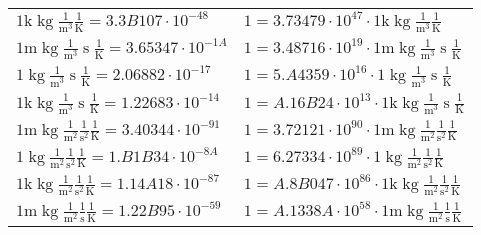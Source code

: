 \begin{center}
\begin{longtable}{l l}
{\color{gray}$1 \bm{\mathrm{ k}}\operatorname{kg}\frac1{\operatorname{m}^3}{}{}\frac1{\operatorname{K}} = 3.3B107\cdot10^{-48} $}   & {\color{gray}$ 1 = 3.73479\cdot10^{47} \cdot 1 \bm{\mathrm{ k}}\operatorname{kg}\frac1{\operatorname{m}^3}{}{}\frac1{\operatorname{K}}$}  \\
{\color{gray}$1 \bm{\mathrm{ m}}\operatorname{kg}\frac1{\operatorname{m}^3}{\operatorname{s}}{}\frac1{\operatorname{K}} = 3.65347\cdot10^{-1A} $}   & {\color{gray}$ 1 = 3.48716\cdot10^{19} \cdot 1 \bm{\mathrm{ m}}\operatorname{kg}\frac1{\operatorname{m}^3}{\operatorname{s}}{}\frac1{\operatorname{K}}$}  \\
{\color{black}$1 \bm{\mathrm{ }}\operatorname{kg}\frac1{\operatorname{m}^3}{\operatorname{s}}{}\frac1{\operatorname{K}} = 2.06882\cdot10^{-17} $}   & {\color{black}$ 1 = 5.A4359\cdot10^{16} \cdot 1 \bm{\mathrm{ }}\operatorname{kg}\frac1{\operatorname{m}^3}{\operatorname{s}}{}\frac1{\operatorname{K}}$}  \\
{\color{gray}$1 \bm{\mathrm{ k}}\operatorname{kg}\frac1{\operatorname{m}^3}{\operatorname{s}}{}\frac1{\operatorname{K}} = 1.22683\cdot10^{-14} $}   & {\color{gray}$ 1 = A.16B24\cdot10^{13} \cdot 1 \bm{\mathrm{ k}}\operatorname{kg}\frac1{\operatorname{m}^3}{\operatorname{s}}{}\frac1{\operatorname{K}}$}  \\
{\color{gray}$1 \bm{\mathrm{ m}}\operatorname{kg}\frac1{\operatorname{m}^2}\frac1{\operatorname{s}^2}{}\frac1{\operatorname{K}} = 3.40344\cdot10^{-91} $}   & {\color{gray}$ 1 = 3.72121\cdot10^{90} \cdot 1 \bm{\mathrm{ m}}\operatorname{kg}\frac1{\operatorname{m}^2}\frac1{\operatorname{s}^2}{}\frac1{\operatorname{K}}$}  \\
{\color{black}$1 \bm{\mathrm{ }}\operatorname{kg}\frac1{\operatorname{m}^2}\frac1{\operatorname{s}^2}{}\frac1{\operatorname{K}} = 1.B1B34\cdot10^{-8A} $}   & {\color{black}$ 1 = 6.27334\cdot10^{89} \cdot 1 \bm{\mathrm{ }}\operatorname{kg}\frac1{\operatorname{m}^2}\frac1{\operatorname{s}^2}{}\frac1{\operatorname{K}}$}  \\
{\color{gray}$1 \bm{\mathrm{ k}}\operatorname{kg}\frac1{\operatorname{m}^2}\frac1{\operatorname{s}^2}{}\frac1{\operatorname{K}} = 1.14A18\cdot10^{-87} $}   & {\color{gray}$ 1 = A.8B047\cdot10^{86} \cdot 1 \bm{\mathrm{ k}}\operatorname{kg}\frac1{\operatorname{m}^2}\frac1{\operatorname{s}^2}{}\frac1{\operatorname{K}}$}  \\
{\color{gray}$1 \bm{\mathrm{ m}}\operatorname{kg}\frac1{\operatorname{m}^2}\frac1{\operatorname{s}}{}\frac1{\operatorname{K}} = 1.22B95\cdot10^{-59} $}   & {\color{gray}$ 1 = A.1338A\cdot10^{58} \cdot 1 \bm{\mathrm{ m}}\operatorname{kg}\frac1{\operatorname{m}^2}\frac1{\operatorname{s}}{}\frac1{\operatorname{K}}$}  \\

\end{longtable}
\end{center}
